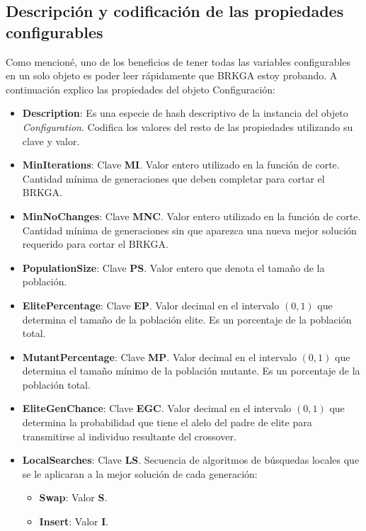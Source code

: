 \bigskip

\subsection{Descripción y codificación de las propiedades configurables}\label{sec:descrCongif}

Como mencioné, uno de los beneficios de tener todas las variables configurables en un solo objeto es poder leer rápidamente que BRKGA estoy probando. A continuación explico las propiedades del objeto Configuración:

\begin{itemize}
  \item \textbf{Description}: Es una especie de hash descriptivo de la instancia del objeto \textit{Configuration}. Codifica los valores del resto de las propiedades utilizando su clave y valor.
  \item \textbf{MinIterations}: Clave \textbf{MI}. Valor entero utilizado en la función de corte. Cantidad mínima de generaciones que deben completar para cortar el BRKGA. 
  \item \textbf{MinNoChanges}: Clave \textbf{MNC}. Valor entero utilizado en la función de corte. Cantidad mínima de generaciones sin que aparezca una nueva mejor solución requerido para cortar el BRKGA.
  \item \textbf{PopulationSize}: Clave \textbf{PS}. Valor entero que denota el tamaño de la población.
  \item \textbf{ElitePercentage}: Clave \textbf{EP}. Valor decimal en el intervalo $(0, 1)$ que determina el tamaño de la población elite. Es un porcentaje de la población total.
  \item \textbf{MutantPercentage}: Clave \textbf{MP}. Valor decimal en el intervalo $(0, 1)$ que determina el tamaño mínimo de la población mutante. Es un porcentaje de la población total.
  \item \textbf{EliteGenChance}: Clave \textbf{EGC}. Valor decimal en el intervalo $(0, 1)$ que determina la probabilidad que tiene el alelo del padre de elite para transmitirse al individuo resultante del crossover.
  \item \textbf{LocalSearches}: Clave \textbf{LS}. Secuencia de algoritmos de búsquedas locales que se le aplicaran a la mejor solución de cada generación:
	\begin{itemize}
		\item \textbf{Swap}: Valor \textbf{S}.
		\item \textbf{Insert}: Valor \textbf{I}.

\end{itemize}
\end{itemize}
